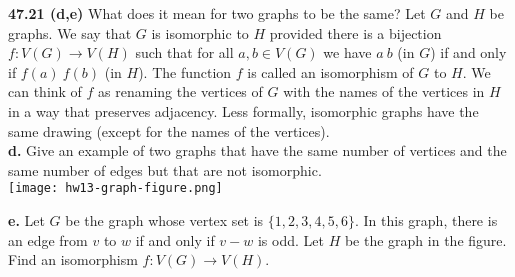 \documentclass[10pt]{article}
\begin{document}
\begin{framed}
	\textbf{47.21 (d,e)} What does it mean for two graphs to be the same? Let $G$ and $H$ be graphs. 
	We say that $G$ is isomorphic to $H$ provided there is a bijection $f: V(G) \rightarrow V(H)$ 
	such that for all $a, b \in V(G)$ we have $a ~ b$ (in $G$) if and only if $f(a) ~ f(b)$ (in $H$). 
	The function $f$ is called an isomorphism of $G$ to $H$.
	We can think of $f$ as renaming the vertices of $G$ with the names of the vertices in $H$ in a way that 
	preserves adjacency. Less formally, isomorphic graphs have the same drawing (except for the names of 
	the vertices).\\

	\textbf{d.} Give an example of two graphs that have the same number of vertices and the same number of 
	edges but that are not isomorphic.\\

	\texttt{[image: hw13-graph-figure.png]}

	\textbf{e.} Let $G$ be the graph whose vertex set is $\{1, 2, 3, 4, 5, 6\}$. In this graph, there 
	is an edge from $v$ to $w$ if and only if $v-w$ is odd. Let $H$ be the graph in the figure. 
	Find an isomorphism $f: V(G) \rightarrow V(H)$.
\end{framed}
\end{document}
